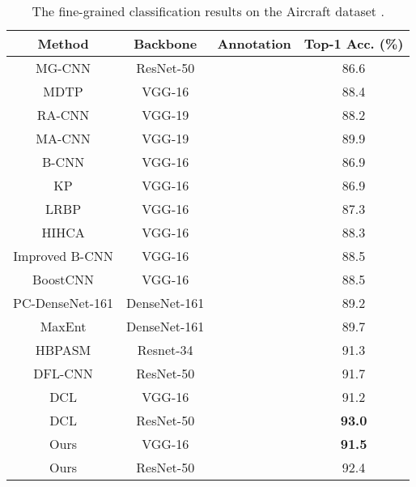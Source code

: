 \documentclass[10pt,twocolumn,letterpaper]{article}
\begin{document}
\begin{table}[t]
    \centering
    \small{ \setlength{\tabcolsep}{1.0pt}
    \caption{The fine-grained classification results on the Aircraft dataset \cite{maji13fine-grained}.}
    \vspace{-2mm}
    \label{tab:aircraft}    
    \begin{tabular}{cccc}
    	\toprule
    	                      Method                       &   Backbone   & Annotation & Top-1 Acc. (\%) \\ \midrule
    	     MG-CNN \cite{DBLP:conf/iccv/WangSSZXZ15}      &  ResNet-50   & \checkmark &      86.6       \\
    	     MDTP \cite{DBLP:journals/corr/WangCMD16}      &    VGG-16    & \checkmark &      88.4       \\ \midrule
    	       RA-CNN \cite{DBLP:conf/cvpr/FuZM17}         &    VGG-19    &    &      88.2       \\
    	     MA-CNN \cite{DBLP:conf/iccv/ZhengFML17}       &    VGG-19    &    &      89.9       \\
    	       B-CNN \cite{DBLP:conf/iccv/LinRM15}         &    VGG-16    &    &      86.9       \\
    	       KP \cite{DBLP:conf/cvpr/CuiZWLLB17}         &    VGG-16    &    &      86.9       \\
    	      LRBP \cite{DBLP:journals/corr/KongF16}       &    VGG-16    &    &      87.3       \\
    	       HIHCA \cite{DBLP:conf/iccv/CaiZZ17}         &    VGG-16    &    &      88.3       \\
    	   Improved B-CNN \cite{DBLP:conf/bmvc/LinM17}     &    VGG-16    &    &      88.5       \\
    	  BoostCNN \cite{DBLP:conf/bmvc/MoghimiBSYVL16}    &    VGG-16    &    &      88.5       \\
    	PC-DenseNet-161 \cite{DBLP:conf/eccv/DubeyGGRFN18} & DenseNet-161 &    &      89.2       \\
    	     MaxEnt \cite{DBLP:conf/nips/DubeyGRN18}       & DenseNet-161 &    &      89.7       \\
    	              HBPASM \cite{8805063}                &  Resnet-34   &    &      91.3       \\
    	      DFL-CNN \cite{DBLP:conf/cvpr/WangMD18}       &  ResNet-50   &    &      91.7       \\
    	            DCL \cite{Chen_2019_CVPR}              &    VGG-16    &    &      91.2       \\
    	            DCL \cite{Chen_2019_CVPR}              &  ResNet-50   &    &  \textbf{93.0}  \\
	            \hline
    	                       Ours                        &    VGG-16    &    &  \textbf{91.5}  \\
    	                       Ours                        &  ResNet-50   &    &      92.4       \\ \bottomrule
    \end{tabular}}
\end{table}
\end{document}
